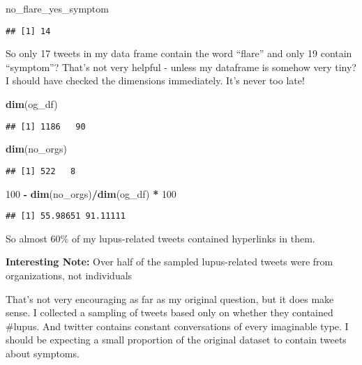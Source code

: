\documentclass[]{article}
\newenvironment{Shaded}{\begin{snugshade}}{\end{snugshade}}
\newcommand{\DecValTok}[1]{\textcolor[rgb]{0.00,0.00,0.81}{#1}}
\newcommand{\KeywordTok}[1]{\textcolor[rgb]{0.13,0.29,0.53}{\textbf{#1}}}
\newcommand{\NormalTok}[1]{#1}
\newcommand{\OperatorTok}[1]{\textcolor[rgb]{0.81,0.36,0.00}{\textbf{#1}}}
\newcommand{\StringTok}[1]{\textcolor[rgb]{0.31,0.60,0.02}{#1}}
\begin{document}
\begin{Shaded}
\begin{Highlighting}[]
\NormalTok{no_flare_yes_symptom}
\end{Highlighting}
\end{Shaded}

\begin{verbatim}
## [1] 14
\end{verbatim}

So only 17 tweets in my data frame contain the word ``flare'' and only
19 contain ``symptom''? That's not very helpful - unless my dataframe is
somehow very tiny? I should have checked the dimensions immediately.
It's never too late!

\begin{Shaded}
\begin{Highlighting}[]
\KeywordTok{dim}\NormalTok{(og_df)}
\end{Highlighting}
\end{Shaded}

\begin{verbatim}
## [1] 1186   90
\end{verbatim}

\begin{Shaded}
\begin{Highlighting}[]
\KeywordTok{dim}\NormalTok{(no_orgs)}
\end{Highlighting}
\end{Shaded}

\begin{verbatim}
## [1] 522   8
\end{verbatim}

\begin{Shaded}
\begin{Highlighting}[]
\DecValTok{100} \OperatorTok{-}\StringTok{ }\KeywordTok{dim}\NormalTok{(no_orgs)}\OperatorTok{/}\KeywordTok{dim}\NormalTok{(og_df) }\OperatorTok{*}\StringTok{ }\DecValTok{100}
\end{Highlighting}
\end{Shaded}

\begin{verbatim}
## [1] 55.98651 91.11111
\end{verbatim}

So almost 60\% of my lupus-related tweets contained hyperlinks in them.

\textbf{Interesting Note:} Over half of the sampled lupus-related tweets
were from organizations, not individuals

That's not very encouraging as far as my original question, but it does
make sense. I collected a sampling of tweets based only on whether they
contained \#lupus. And twitter contains constant conversations of every
imaginable type. I should be expecting a small proportion of the
original dataset to contain tweets about symptoms.
\end{document}
